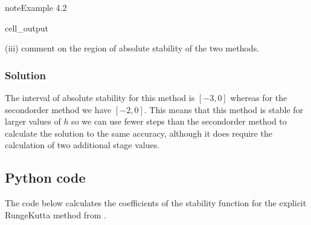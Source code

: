 \documentclass[letterpaper,10pt,english]{jupyterBook}
\begin{document}
\begin{sphinxadmonition}{note}{Example 4.2}
\begin{sphinxVerbatimOutput}
\begin{sphinxuseclass}{cell_output}
\noindent{}

\end{sphinxuseclass}\end{sphinxVerbatimOutput}

\sphinxAtStartPar
(iii) comment on the region of absolute stability of the two methods.
\subsubsection*{Solution}

\sphinxAtStartPar
The interval of absolute stability for this method is \([-3,0]\) whereas for the second\sphinxhyphen{}order method we have \([-2,0]\). This means that this method is stable for larger values of \(h\) so we can use fewer steps than the second\sphinxhyphen{}order method to calculate the solution to the same accuracy, although it does require the calculation of two additional stage values.
\end{sphinxadmonition}


\subsection{Python code}
\label{\detokenize{4_Stability/4.2_RK_stability_function:python-code}}
\sphinxAtStartPar
The code below calculates the coefficients of the stability function for the explicit Runge\sphinxhyphen{}Kutta method from {\hyperref[\detokenize{4_Stability/4.2_RK_stability_function:erk-stability-example}]{}}.
\end{document}

